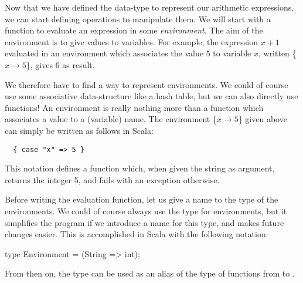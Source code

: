 \documentclass[a4paper,12pt,twoside,titlepage]{article}
\newcommand{\langname}[1]{#1\xspace}
\newcommand{\Scala}{\langname{Scala}}
\begin{document}
Now that we have defined the data-type to represent our arithmetic
expressions, we can start defining operations to manipulate them. We
will start with a function to evaluate an expression in some
\emph{environment}. The aim of the environment is to give values to
variables. For example, the expression $x+1$ evaluated in an
environment which associates the value $5$ to variable $x$, written
\{$x\rightarrow 5$\}, gives $6$ as result.

We therefore have to find a way to represent environments. We could of
course use some associative data-structure like a hash table, but we
can also directly use functions! An environment is really nothing more
than a function which associates a value to a (variable) name. The
environment \{$x\rightarrow 5$\} given above can simply be written as
follows in \Scala:
\begin{lstlisting}
  { case "x" => 5 }
\end{lstlisting}
This notation defines a function which, when given the string
 as argument, returns the integer 5, and fails with an
exception otherwise.

Before writing the evaluation function, let us give a name to the type
of the environments. We could of course always use the type
 for environments, but it simplifies the program
if we introduce a name for this type, and makes future changes easier.
This is accomplished in \Scala with the following notation:
\begin{scalainvisiblecode}
object Calculator {
\end{scalainvisiblecode}
\begin{scalacode}
  type Environment = (String => int);
\end{scalacode}
From then on, the type  can be used as an alias of
the type of functions from  to .
\end{document}
